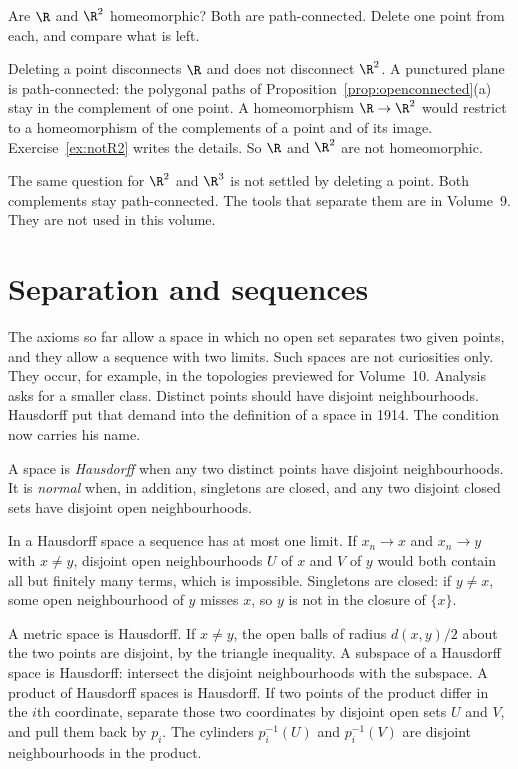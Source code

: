 \begin{think}
Are $\R$ and $\R^2$ homeomorphic? Both are path-connected. Delete one point from each, and compare what is left.
\end{think}

Deleting a point disconnects $\R$ and does not disconnect $\R^2$. A punctured plane is path-connected: the polygonal paths of Proposition~\ref{prop:openconnected}(a) stay in the complement of one point. A homeomorphism $\R\to\R^2$ would restrict to a homeomorphism of the complements of a point and of its image. Exercise~\ref{ex:notR2} writes the details. So $\R$ and $\R^2$ are not homeomorphic.

The same question for $\R^2$ and $\R^3$ is not settled by deleting a point. Both complements stay path-connected. The tools that separate them are in Volume~9. They are not used in this volume.

\section{Separation and sequences}

The axioms so far allow a space in which no open set separates two given points, and they allow a sequence with two limits. Such spaces are not curiosities only. They occur, for example, in the topologies previewed for Volume~10. Analysis asks for a smaller class. Distinct points should have disjoint neighbourhoods. Hausdorff put that demand into the definition of a space in 1914. The condition now carries his name.

\begin{definition}
A space is \emph{Hausdorff} when any two distinct points have disjoint neighbourhoods. It is \emph{normal} when, in addition, singletons are closed, and any two disjoint closed sets have disjoint open neighbourhoods.
\end{definition}

In a Hausdorff space a sequence has at most one limit. If $x_n\to x$ and $x_n\to y$ with $x\ne y$, disjoint open neighbourhoods $U$ of $x$ and $V$ of $y$ would both contain all but finitely many terms, which is impossible. Singletons are closed: if $y\ne x$, some open neighbourhood of $y$ misses $x$, so $y$ is not in the closure of $\{x\}$.

A metric space is Hausdorff. If $x\ne y$, the open balls of radius $d(x,y)/2$ about the two points are disjoint, by the triangle inequality. A subspace of a Hausdorff space is Hausdorff: intersect the disjoint neighbourhoods with the subspace. A product of Hausdorff spaces is Hausdorff. If two points of the product differ in the $i$th coordinate, separate those two coordinates by disjoint open sets $U$ and $V$, and pull them back by $p_i$. The cylinders $p_i^{-1}(U)$ and $p_i^{-1}(V)$ are disjoint neighbourhoods in the product.

